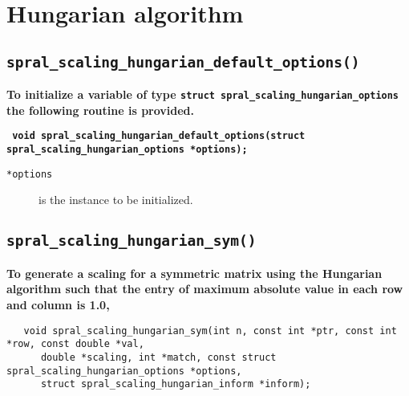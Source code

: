 
\section{Hungarian algorithm}

\subsection{\texttt{spral\_scaling\_hungarian\_default\_options()}}

\textbf{To initialize a variable of type
   \texttt{struct spral\_scaling\_hungarian\_options} the following routine
   is provided.}

\vspace*{0.3cm}
\noindent
\textbf{\texttt{
   \hspace*{0.3cm} void spral\_scaling\_hungarian\_default\_options(struct spral\_scaling\_hungarian\_options *options);
}}
\vspace*{-0.4cm}

\begin{description}
   \item[\texttt{*options}] is the instance to be initialized.
\end{description}

\subsection{\texttt{spral\_scaling\_hungarian\_sym()}}

\textbf{\noindent
   To generate a scaling for a symmetric matrix using the Hungarian algorithm such that the entry of maximum absolute value in each row and column is 1.0,
}
\vspace*{-0.1cm}
\begin{verbatim}
   void spral_scaling_hungarian_sym(int n, const int *ptr, const int *row, const double *val,
      double *scaling, int *match, const struct spral_scaling_hungarian_options *options,
      struct spral_scaling_hungarian_inform *inform);
\end{verbatim}

